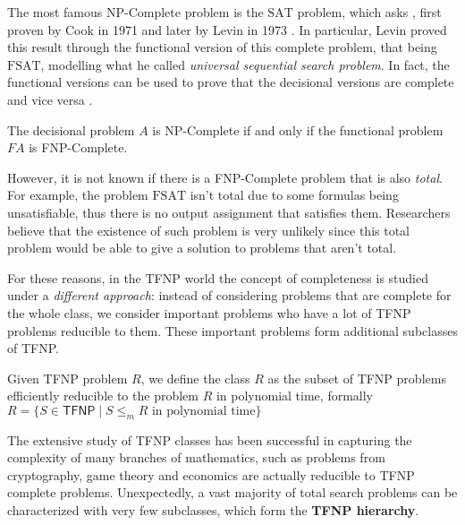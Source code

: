 The most famous \textsf{NP}-Complete problem is the $\mathrm{SAT}$ problem, which asks , first proven by Cook in 1971 \cite{cook_sat} and later by Levin in 1973 \cite{levin_fsat}. In particular, Levin proved this result through the functional version of this complete problem, that being $\mathrm{FSAT}$, modelling what he called \textit{universal sequential search problem}. In fact, the functional versions can be used to prove that the decisional versions are complete and vice versa \cite{rel_comp_np_search}.

\begin{proposition}
    The decisional problem $A$ is \textsf{NP}-Complete if and only if the functional problem $FA$ is \textsf{FNP}-Complete.
\end{proposition}
    
However, it is not known if there is a \textsf{FNP}-Complete problem that is also \textit{total}. For example, the problem $\mathrm{FSAT}$ isn't total due to some formulas being unsatisfiable, thus there is no output assignment that satisfies them. Researchers believe that the existence of such problem is very unlikely since this total problem would be able to give a solution to problems that aren't total.

For these reasons, in the \textsf{TFNP} world the concept of completeness is studied under a \textit{different approach}: instead of considering problems that are complete for the whole class, we consider important problems who have a lot of \textsf{TFNP} problems reducible to them. These important problems form additional subclasses of \textsf{TFNP}.  

\begin{definition}
    Given \textsf{TFNP} problem $R$, we define the class $R$ as the subset of \textsf{TFNP} problems efficiently reducible to the problem $R$ in polynomial time, formally $R = \{S \in \mathsf{TFNP} \mid S \leq_m R \text{ in polynomial time}\}$
\end{definition}

The extensive study of \textsf{TFNP} classes has been successful in capturing the complexity of many branches of mathematics, such as problems from cryptography, game theory and economics are actually reducible to TFNP complete problems. Unexpectedly, a vast majority of total search problems can be characterized with very few subclasses, which form the \textbf{\textsf{TFNP} hierarchy}. 

\newpage

